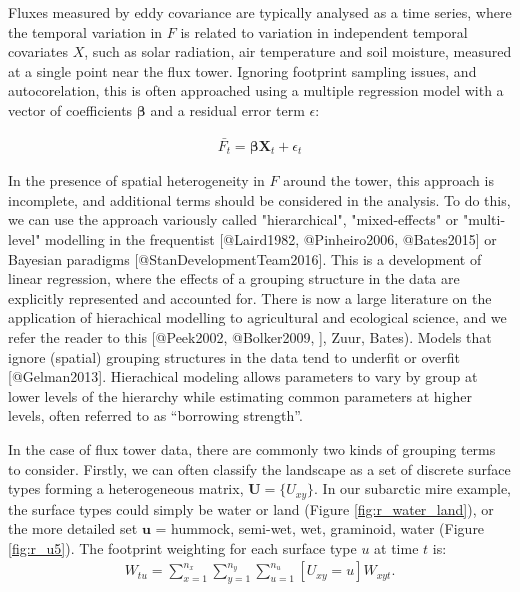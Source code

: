 Fluxes measured by eddy covariance are typically analysed as a time series, where the temporal variation in $F$ is related to variation in independent temporal covariates $X$, such as solar radiation, air temperature and soil moisture, measured at a single point near the flux tower.  Ignoring footprint sampling issues, and autocorelation, this is often approached using a multiple regression model with a vector of coefficients $\boldsymbol{\beta}$ and a residual error term $\epsilon$:

\begin{align}   \label{eq:timeVarn}
  \bar{F_t} = \boldsymbol{\beta} \mathbf{X}_t + \epsilon_{t}
\end{align}

In the presence of spatial heterogeneity in $F$ around the tower, this approach is incomplete, and additional terms should be considered in the analysis. 
To do this, we can use the approach variously called "hierarchical", "mixed-effects" or "multi-level" modelling in the frequentist [@Laird1982, @Pinheiro2006, @Bates2015] or Bayesian paradigms [@StanDevelopmentTeam2016]. 
This is a development of linear regression, where the effects of a grouping structure in the data are explicitly represented and accounted for. There is now a large literature on the application of hierachical modelling to agricultural and ecological science, and we refer the reader to this [@Peek2002, @Bolker2009, ], Zuur, Bates). 
Models that ignore (spatial) grouping structures in the data tend to underfit or overfit [@Gelman2013]. 
Hierachical modeling allows parameters to vary by group at lower levels of the hierarchy while estimating common parameters at higher levels, often referred to as ``borrowing strength''.

In the case of flux tower data, there are commonly two kinds of grouping terms to consider. 
Firstly, we can often classify the landscape as a set of discrete surface types forming a heterogeneous matrix, $\mathbf{U} = \{U_{xy}\}$. In our subarctic mire example, the surface types could simply be water or land (Figure \ref{fig:r_water_land}), or the more detailed set $\mathbf{u}$ = {hummock, semi-wet, wet, graminoid, water} (Figure \ref{fig:r_u5}). The footprint weighting for each surface type $u$ at time $t$ is:
\begin{align}   \label{eq:uWtMean}
  W_{tu} = \sum_{x = 1}^{n_x} \sum_{y = 1}^{n_y}  \sum_{u = 1}^{n_u} [U_{xy} = u] W_{xyt}.
\end{align}

